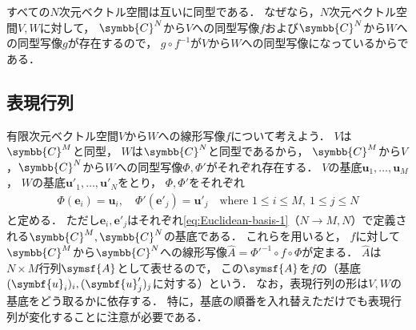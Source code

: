 \documentclass[
]{sotsu}
\begin{document}
すべての$N$次元ベクトル空間は互いに同型である．
なぜなら，$N$次元ベクトル空間$V, W$に対して，
$\symbb{C}^N$から$V$への同型写像$f$および$\symbb{C}^N$から$W$への同型写像$g$が存在するので，
$g \circ f^{-1}$が$V$から$W$への同型写像になっているからである．



\subsection{表現行列}
\label{sec:representation-matrix}

有限次元ベクトル空間$V$から$W$への線形写像$f$について考えよう．
$V$は$\symbb{C}^M$と同型，
$W$は$\symbb{C}^N$と同型であるから，
$\symbb{C}^M$から$V$，$\symbb{C}^N$から$W$への同型写像$\Phi, \Phi'$がそれぞれ存在する．
$V$の基底$\symbf{u}_1, \dots, \symbf{u}_M$，
$W$の基底$\symbf{u}'_1, \dots, \symbf{u}'_N$をとり，
$\Phi, \Phi'$をそれぞれ
\begin{align*}
    \Phi(\symbf{e}_i) = \symbf{u}_i,
    \quad 
    \Phi'(\symbf{e}'_j) = \symbf{u}'_j
    \quad 
    \text{where }
    1 \leq i \leq M, \  
    1 \leq j \leq N
\end{align*}
と定める．
ただし$\symbf{e}_i, \symbf{e}'_j$はそれぞれ\cref{eq:Euclidean-basis-1}（$N \to M, N$）で定義される$\symbb{C}^M, \symbb{C}^N$の基底である．
これらを用いると，
$f$に対して$\symbb{C}^M$から$\symbb{C}^N$への線形写像$\hat{A} = \Phi'^{-1} \circ f \circ \Phi$が定まる．
$\hat{A}$は$N \times M$行列$\symsf{A}$として表せるので，
この$\symsf{A}$を$f$の（基底$\sequ{\symbf{u}_i}[i], \sequ{\symbf{u}'_j}[j]$に対する）という．
なお，表現行列の形は$V, W$の基底をどう取るかに依存する．
特に，基底の順番を入れ替えただけでも表現行列が変化することに注意が必要である．
\end{document}
